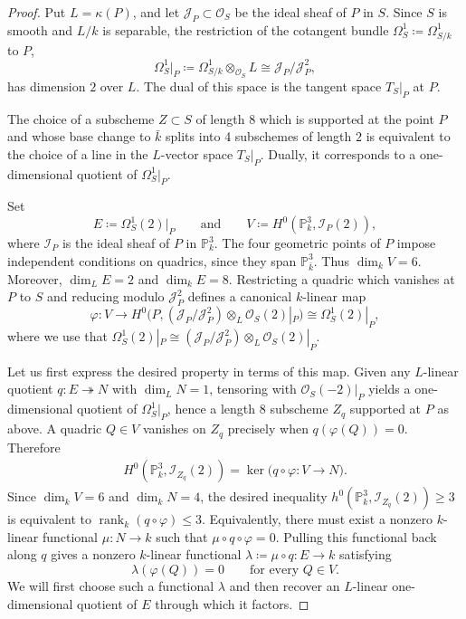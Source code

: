 \documentclass[a4paper,11pt]{amsart}
\numberwithin{equation}{section}
\theoremstyle{definition}
\theoremstyle{remark}
\newcommand{\PP}{\mathbb P}
\newcommand{\CP}{\PP}
\begin{document}
\begin{proof}
Put $L=\kappa (P)$, and let $\mathcal J_{P}\subset \mathcal O_S$ be the ideal sheaf of $P$ in $S$. 
Since $S$ is smooth and $L/k$ is separable, the restriction of the cotangent bundle $\Omega^1_{S}\coloneq \Omega^1_{S/k}$ to $P$,
\[
\Omega^1_{S}|_P\coloneq \Omega^1_{S/k}\otimes_{\mathcal O_S} L\cong \mathcal J_P/\mathcal J_P^2 ,
\]
has dimension $2$ over $L$.
The dual of this space is the tangent space $T_{S}|_P$ at $P$.

The choice of a subscheme $Z\subset S$ of length $8$ which is supported at the point $P$ and whose base change to $\bar k$ splits into 4 subschemes of length $2$ is equivalent to the choice of a line in the $L$-vector space $T_{S}|_P$.
Dually, it corresponds to a one-dimensional quotient of $\Omega^1_{S}|_P$.

Set
\[
  E\coloneq \Omega^1_S(2)|_P   \qquad \text{and}   \qquad V\coloneq H^0(\CP^3_k,\mathcal I_P(2)),
\]
where $\mathcal I_P$ is the ideal sheaf of $P$ in $\CP^3_k$.
The four geometric points of $P$ impose independent conditions on quadrics, since they span $\CP^3_{\bar k}$. 
Thus $\dim_k V=6$.
Moreover, $\dim_L E=2$ and $\dim_k E=8$. 
Restricting a quadric which vanishes at $P$ to $S$ and reducing modulo $\mathcal J_P^2$ defines a canonical $k$-linear map
\[
  \varphi \colon V\longrightarrow H^0\bigl(P,(\mathcal J_P/\mathcal J_P^2)\otimes_L \mathcal O_S(2)|_P\bigr)\cong \Omega^1_S(2)|_P ,
\]
where we use that $ \Omega^1_S(2)|_P\cong (\mathcal J_P/\mathcal J_P^2)\otimes_L \mathcal O_S(2)|_P$.

Let us first express the desired property in terms of this map.
Given any $L$-linear quotient $q\colon E\twoheadrightarrow N$ with $\dim_L N=1$, tensoring with $\mathcal O_S(-2)|_P$ yields a one-dimensional quotient of $\Omega^1_S|_P$, hence a length 8 subscheme $Z_q$ supported at $P$ as above.
A quadric $Q\in V$ vanishes on $Z_q$ precisely when $q(\varphi(Q))=0$.
Therefore
\begin{align}\label{eq:arithmetic-first-order-kernel}
  H^0(\CP^3_k,\mathcal I_{Z_q}(2)) =\ker\bigl(q\circ \varphi\colon V\longrightarrow N\bigr).
\end{align}
Since $\dim_k V=6$ and $\dim_k N=4$, the desired inequality $h^0(\CP^3_k,\mathcal I_{Z_q}(2))\geq 3$ is equivalent to $\operatorname{rank}_k(q\circ \varphi)\leq3$.
Equivalently, there must exist a nonzero $k$-linear functional $\mu\colon N\to k$ such that $\mu\circ q\circ \varphi=0$.
Pulling this functional back along $q$ gives a nonzero $k$-linear functional $\lambda\coloneq \mu\circ q\colon E\to k$ satisfying
\begin{equation}\label{eq:lambda}
  \lambda(\varphi(Q))=0\qquad\text{for every }Q\in V.
\end{equation}
We will first choose such a functional $\lambda$ and then recover an $L$-linear one-dimensional quotient of $E$ through which it factors.


\end{proof}
\end{document}
